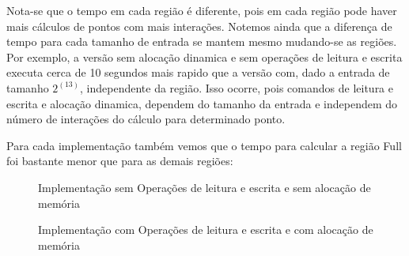 \documentclass[12pt]{article}
\begin{document}
Nota-se que o tempo em cada região é diferente, pois em cada região pode haver mais cálculos de pontos com mais interações. Notemos ainda que a diferença de tempo para cada tamanho de entrada se mantem mesmo mudando-se as regiões. Por exemplo, a versão sem alocação dinamica e sem operações de leitura e escrita executa cerca de 10 segundos mais rapido que a versão com, dado a entrada de tamanho $2^(13)$, independente da região. Isso ocorre, pois comandos de leitura e escrita e alocação dinamica, dependem do tamanho da entrada e independem do número de interações do cálculo para determinado ponto.

Para cada implementação também vemos que o tempo para calcular a região Full foi bastante menor que para as demais regiões:

\begin{figure}[H]
    \caption{Implementação sem Operações de leitura e escrita e sem alocação de memória}
\end{figure}

\begin{figure}[H]
    \caption{Implementação com Operações de leitura e escrita e com alocação de memória}
\end{figure}
\end{document}
